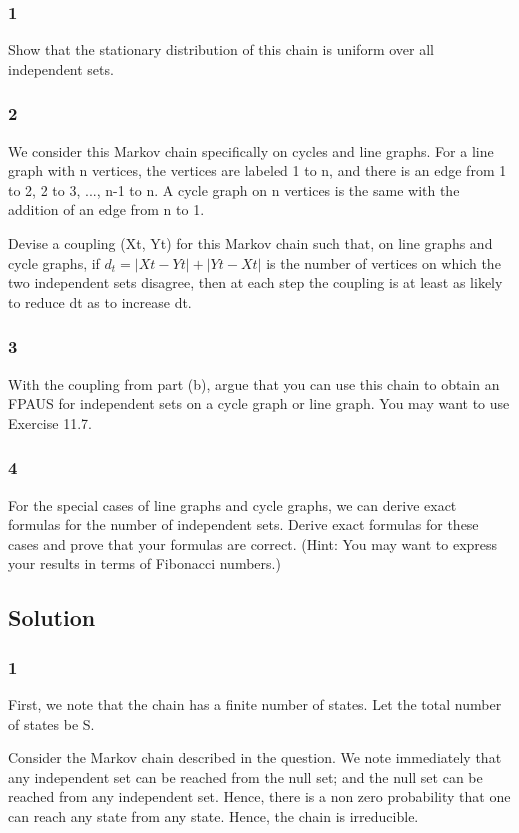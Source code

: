 \documentclass[10pt]{amsart}
\theoremstyle{remark}
\begin{document}
\subsubsection{1} Show that the stationary distribution of this chain is uniform over all independent sets.

\subsubsection{2} We consider this Markov chain specifically on cycles and line graphs. For a line graph with n vertices, the vertices are labeled 1 to n, and there is an edge from 1 to 2, 2 to 3, ..., n-1 to n. A cycle graph on n vertices is the same with the addition of an edge from n to 1.

Devise a coupling (Xt, Yt) for this Markov chain such that, on line graphs and cycle graphs, if $d_{t}=|Xt-Yt|+|Yt-Xt|$ is the number of vertices on which the two independent sets disagree, then at each step the coupling is at least as likely to reduce dt as to increase dt.

\subsubsection{3} With the coupling from part (b), argue that you can use this chain to obtain an FPAUS for independent sets on a cycle graph or line graph. You may want to use Exercise 11.7.
\subsubsection{4} For the special cases of line graphs and cycle graphs, we can derive exact formulas for the number of independent sets. Derive exact formulas for these cases and prove that your formulas are correct. (Hint: You may want to express your results in terms of Fibonacci numbers.)

\subsection{Solution}
\subsubsection{1} 

First, we note that the chain has a finite number of states. Let the total number of states be S.

Consider the Markov chain described in the question. We note immediately that any independent set can be reached from the null set; and the null set can be reached from any independent set. Hence, there is a non zero probability that one can reach any state from any state. Hence, the chain is irreducible.
\end{document}
